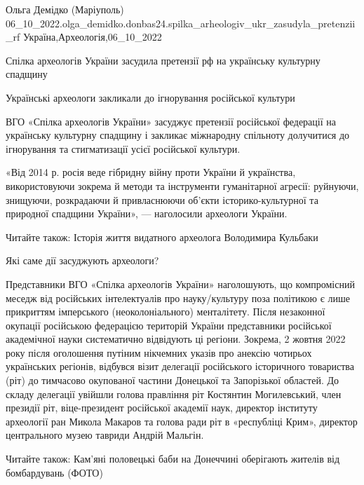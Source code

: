  
 
 
 
 

Ольга Демідко (Маріуполь)
06_10_2022.olga_demidko.donbas24.spilka_arheologiv_ukr_zasudyla_pretenzii_rf
Україна,Археологія,06_10_2022

Спілка археологів України засудила претензії рф на українську культурну
спадщину

Українські археологи закликали до ігнорування російської культури

ВГО «Спілка археологів України» засуджує претензії російської федерації на
українську культурну спадщину і закликає міжнародну спільноту долучитися до
ігнорування та стигматизації усієї російської культури.

«Від 2014 р. росія веде гібридну війну проти України й українства,
використовуючи зокрема й методи та інструменти гуманітарної агресії: руйнуючи,
знищуючи, розкрадаючи й привласнюючи об'єкти історико-культурної та природної
спадщини України», — наголосили археологи України.

Читайте також: Історія життя видатного археолога Володимира Кульбаки

Які саме дії засуджують археологи?

Представники ВГО «Спілка археологів України» наголошують, що компромісний
меседж від російських інтелектуалів про науку/культуру поза політикою є лише
прикриттям імперського (неоколоніального) менталітету. Після незаконної
окупації російською федерацією територій України представники російської
академічної науки систематично відвідують ці регіони. Зокрема, 2 жовтня 2022
року після оголошення путіним нікчемних указів про анексію чотирьох українських
регіонів, відбувся візит делегації російського історичного товариства (ріт) до
тимчасово окупованої частини Донецької та Запорізької областей. До складу
делегації увійшли голова правління ріт Костянтин Могилевський, член президії
ріт, віце-президент російської академії наук, директор інституту археології ран
Микола Макаров та голова ради ріт в «республіці Крим», директор центрального
музею тавриди Андрій Мальгін.

Читайте також: Кам’яні половецькі баби на Донеччині оберігають жителів від
бомбардувань (ФОТО)

